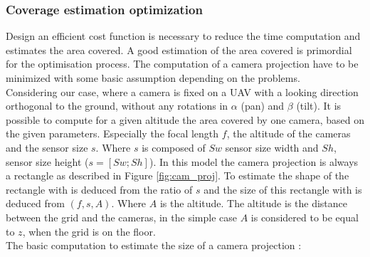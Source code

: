 \subsubsection{Coverage estimation optimization} \label{sec:coverageEstimation}
Design an efficient cost function is necessary to reduce the time computation and estimates the area covered. A good estimation of the area covered is primordial for the optimisation process. 
  The computation of a camera projection have to be minimized with some basic assumption depending on the problems.\\
Considering our case, where a camera is fixed on a UAV with a looking direction orthogonal to the ground, without any rotations in $\alpha$ (pan) and $\beta$ (tilt). It is possible to compute for a given altitude the area covered by one camera, based on the given parameters. Especially the focal length $f$, the altitude of the cameras and the sensor size $s$. Where $s$ is composed of $Sw$ sensor size width and $Sh$, sensor size height ($s= [Sw ; Sh]$). 
In this model the camera projection is always a rectangle as described in Figure \ref{fig:cam_proj}. To estimate the shape of the rectangle with is deduced from the ratio of $s$ and the size of this rectangle with is deduced from $(f ,s ,A)$. Where $A$ is the altitude. The altitude is the distance between the grid and the cameras, in the simple case $A$ is considered to be equal to $z$, when the grid is on the floor.  \\
The basic computation to estimate the size of a camera projection :

